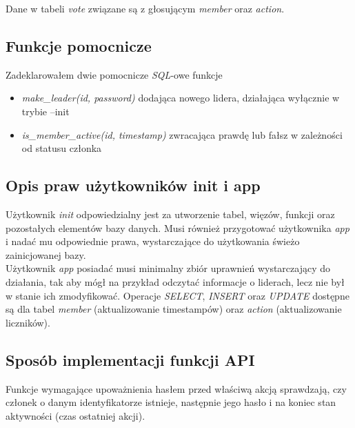 \documentclass[12pt]{article}
\begin{document}
Dane w tabeli \textit{vote} związane są z głosującym \textit{member} oraz \textit{action}.

\subsection{Funkcje pomocnicze}
Zadeklarowałem dwie pomocnicze \textit{SQL}-owe funkcje
\begin{itemize}
	\item \textit{make\_leader(id, password)} dodająca nowego lidera, działająca wyłącznie w trybie --init
	\item \textit{is\_member\_active(id, timestamp)} zwracająca prawdę lub fałsz w zależności od statusu członka
\end{itemize}

\subsection{Opis praw użytkowników init i app}
Użytkownik \textit{init} odpowiedzialny jest za utworzenie tabel, więzów, funkcji oraz pozostałych elementów bazy danych. Musi również przygotować użytkownika \textit{app} i nadać mu odpowiednie prawa, wystarczające do użytkowania świeżo zainicjowanej bazy.\\

Użytkownik \textit{app} posiadać musi minimalny zbiór uprawnień wystarczający do działania, tak aby mógł na przykład odczytać informacje o liderach, lecz nie był w stanie ich zmodyfikować. Operacje \textit{SELECT}, \textit{INSERT} oraz \textit{UPDATE} dostępne są dla tabel \textit{member} (aktualizowanie timestampów) oraz \textit{action} (aktualizowanie liczników).

\subsection{Sposób implementacji funkcji API}
Funkcje wymagające upoważnienia hasłem przed właściwą akcją sprawdzają, czy członek o danym identyfikatorze istnieje, następnie jego hasło i na koniec stan aktywności (czas ostatniej akcji).
\end{document}
